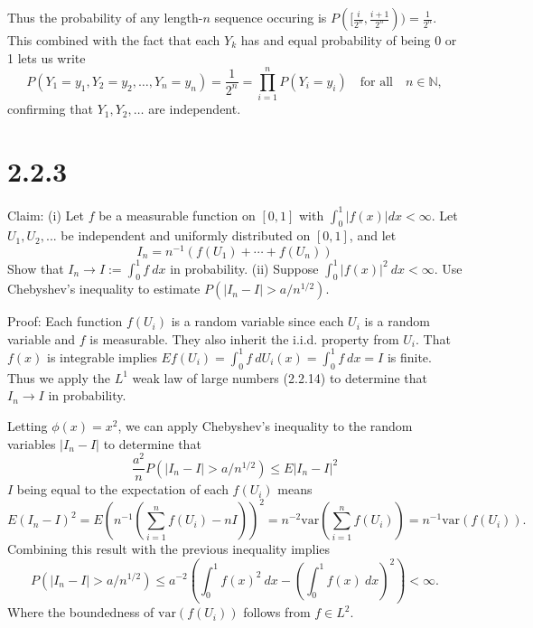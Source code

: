 \documentclass[10pt]{article}
\begin{document}
Thus the probability of any length-$n$ sequence occuring
is $P([\frac{i}{2^n}, \frac{i+1}{2^n})) = \frac{1}{2^n}$. 
This combined with the fact that each $Y_k$ has and
equal probability of being 0 or 1 lets us write
\begin{equation*}
  P(Y_1=y_1, Y_2=y_2, \dots, Y_n=y_n) = \frac{1}{2^n} 
  = \prod_{i=1}^n P(Y_i=y_i) 
  \quad \text{for all} \quad n \in \mathbb{N},
\end{equation*}
confirming that $Y_1,Y_2,\dots$ are independent.

\section*{2.2.3}

Claim: (i) Let $f$ be a measurable function on $[0,1]$
with $\int_0^1 \vert f(x) \vert dx < \infty$.
Let $U_1, U_2,...$ be independent and uniformly distributed
on $[0,1]$, and let
\begin{equation*}
  I_n = n^{-1}(f(U_1) + \cdots + f(U_n))
\end{equation*} 
Show that $I_n \to I := \int_0^1 f \ dx$ in probability.
(ii) Suppose $\int_0^1 \vert f(x) \vert^2 \ dx < \infty$.
Use Chebyshev's inequality to estimate
$P(\vert I_n - I \vert > a/n^{1/2})$.

Proof: Each function $f(U_i)$ is a random variable
since each $U_i$ is a random variable and $f$ is
measurable. They also inherit the i.i.d. property from $U_i$.
That $f(x)$ is integrable implies 
$E f(U_i) = \int_0^1 f \ dU_i(x) = \int_0^1 f \ dx = I$ 
is finite. Thus we apply the $L^1$ weak law of large numbers (2.2.14)
to determine that $I_n \to I$ in probability.

Letting $\phi(x) = x^2$, we can apply 
Chebyshev's inequality to the random variables
$\vert I_n - I \vert$ to determine that
\begin{equation*}
  \frac{a^2}{n} P(\vert I_n - I \vert > a/n^{1/2})
  \le E \vert I_n - I \vert^2
\end{equation*}
$I$ being equal to the expectation of each 
$f(U_i)$ means
\begin{equation*}
  E(I_n - I)^2
  = E(n^{-1} ( \sum_{i=1}^n f(U_i) - nI) )^2
  = n^{-2} \text{var}(\sum_{i=1}^n f(U_i))
  = n^{-1} \text{var}(f(U_i)).
\end{equation*}
Combining this result with the previous inequality implies
\begin{equation*}
  P(\vert I_n - I \vert > a/n^{1/2}) 
  \le a^{-2} \left( \int_0^1 f(x)^2 \ dx 
  - \left(\int_0^1 f(x) \ dx \right)^2 \right)
  < \infty.
\end{equation*}
Where the boundedness of $\text{var}(f(U_i))$ follows from
$f \in L^2$.
\end{document}
